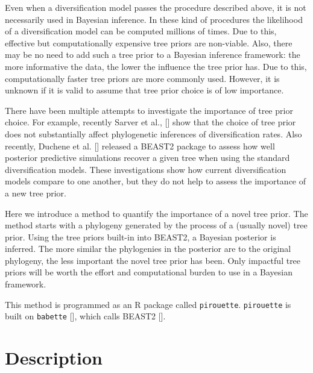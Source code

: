 \documentclass{article}
\begin{document}
Even when a diversification model passes the procedure described above,
it is not necessarily used in Bayesian inference.
In these kind of procedures the likelihood of a diversification 
model can be computed millions of times.
Due to this, effective but computationally expensive tree priors are non-viable.
Also, there may be no need to add such a tree prior to a Bayesian
inference framework: the more informative the data, 
the lower the influence the tree prior has.
Due to this, computationally faster tree priors are more commonly used.
However, it is unknown if it is valid to assume that tree prior choice is 
of low importance.

There have been multiple attempts to investigate the importance of tree
prior choice. For example, recently Sarver et al., [\cite{sarver2019choice}] 
show that the choice of tree prior does not 
substantially affect phylogenetic inferences of diversification rates.
Also recently, Duchene et al. [\cite{duchene2018phylodynamic}] released
a BEAST2 package to assess how well posterior predictive simulations
recover a given tree when using the standard diversification models.
These investigations show how current diversification models compare
to one another, but they do not help to assess the importance of a 
new tree prior. 

Here we introduce a method to quantify the importance of a novel tree prior.
The method starts with a phylogeny generated by the process of 
a (usually novel) tree prior.
Using the tree priors built-in into BEAST2, 
a Bayesian posterior is inferred.
The more similar the phylogenies in the posterior are to the original phylogeny,
the less important the novel tree prior has been.
Only impactful tree priors will be worth the effort and computational burden 
to use in a Bayesian framework.

This method is programmed as an R package called \verb;pirouette;.
\verb;pirouette; is built on \verb;babette; [\cite{bilderbeek2018babette}], 
which calls BEAST2 [\cite{bouckaert2014beast}]. 

\section{Description}
\end{document}
